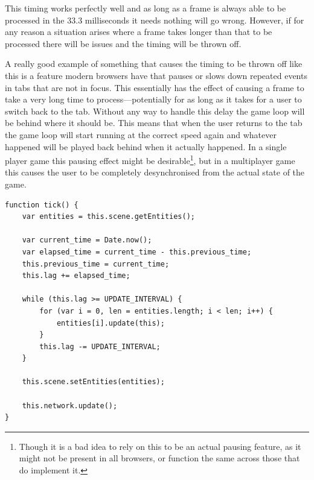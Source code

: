 This timing works perfectly well and as long as a frame is always able to be processed in the 33.3 milliseconds it needs nothing will go wrong. However, if for any reason a situation arises where a frame takes longer than that to be processed there will be issues and the timing will be thrown off.

A really good example of something that causes the timing to be thrown off like this is a feature modern browsers have that pauses or slows down repeated events in tabs that are not in focus. This essentially has the effect of causing a frame to take a very long time to process---potentially for as long as it takes for a user to switch back to the tab. Without any way to handle this delay the game loop will be behind where it should be. This means that when the user returns to the tab the game loop will start running at the correct speed again and whatever happened will be played back behind when it actually happened. In a single player game this pausing effect might be desirable\footnote{Though it is a bad idea to rely on this to be an actual pausing feature, as it might not be present in all browsers, or function the same across those that do implement it.}, but in a multiplayer game this causes the user to be completely desynchronised from the actual state of the game.

\noindent
\begin{minipage}{\linewidth}
\begin{lstlisting}[style=js, caption={The client-side game loop.}, label=game_loop]
function tick() {
    var entities = this.scene.getEntities();

    var current_time = Date.now();
    var elapsed_time = current_time - this.previous_time;
    this.previous_time = current_time;
    this.lag += elapsed_time;

    while (this.lag >= UPDATE_INTERVAL) {
        for (var i = 0, len = entities.length; i < len; i++) {
            entities[i].update(this);
        }
        this.lag -= UPDATE_INTERVAL;
    }

    this.scene.setEntities(entities);

    this.network.update();
}
\end{lstlisting}
\end{minipage}


